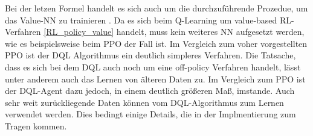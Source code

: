 Bei der letzen Formel handelt es sich auch um die durchzuführende Prozedue, um das Value-NN zu trainieren \cite{DRL}.
Da es sich beim Q-Learning um value-based RL-Verfahren \ref{RL_policy_value} handelt, muss kein weiteres NN aufgesetzt werden, wie es beispielsweise beim PPO der Fall ist. Im Vergleich zum voher vorgestellten PPO ist der DQL Algorithmus ein deutlich simpleres Verfahren. Die Tatsache, dass es sich bei dem DQL auch noch um eine off-policy Verfahren handelt, lässt unter anderem auch das Lernen von älteren Daten zu. Im Vergleich zum PPO ist der DQL-Agent dazu jedoch, in einem deutlich größeren Maß, imstande. Auch sehr weit zurückliegende Daten können vom DQL-Algorithmus zum Lernen verwendet werden. Dies bedingt einige Details, die in der Implmentierung zum Tragen kommen.\\

